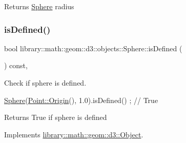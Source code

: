 \begin{DoxyReturn}{Returns}
\hyperlink{classlibrary_1_1math_1_1geom_1_1d3_1_1objects_1_1_sphere}{Sphere} radius 
\end{DoxyReturn}
\mbox{\label{classlibrary_1_1math_1_1geom_1_1d3_1_1objects_1_1_sphere_a0598bd75f8a34e07a3ad36cf10a7f098}} 
\subsubsection{\texorpdfstring{is\+Defined()}{isDefined()}}
{\footnotesize\ttfamily bool library\+::math\+::geom\+::d3\+::objects\+::\+Sphere\+::is\+Defined (\begin{DoxyParamCaption}{ }\end{DoxyParamCaption}) const\hspace{0.3cm}{\ttfamily [override]}, {\ttfamily [virtual]}}



Check if sphere is defined. 


\begin{DoxyCode}
\hyperlink{classlibrary_1_1math_1_1geom_1_1d3_1_1objects_1_1_sphere_a55dccc8ea16ee55cd7694c26afa8ea39}{Sphere}(\hyperlink{classlibrary_1_1math_1_1geom_1_1d3_1_1objects_1_1_point_ab2a38e285c562e50bf350272c083986f}{Point::Origin}(), 1.0).isDefined() ; \textcolor{comment}{// True}
\end{DoxyCode}


\begin{DoxyReturn}{Returns}
True if sphere is defined 
\end{DoxyReturn}


Implements \hyperlink{classlibrary_1_1math_1_1geom_1_1d3_1_1_object_a2216442e322f0c3ca5f01a4efa22baf7}{library\+::math\+::geom\+::d3\+::\+Object}.

\mbox{\label{classlibrary_1_1math_1_1geom_1_1d3_1_1objects_1_1_sphere_a5ec4120b51da519ec14e8bded930b742}} 
